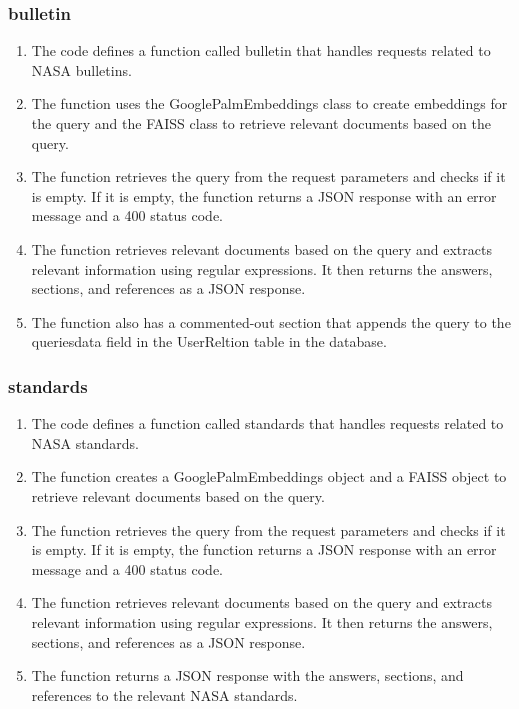 \documentclass[11pt]{article}
\begin{document}
\subsubsection{bulletin}
\begin{enumerate}
	\item The code defines a function called bulletin that handles requests related to NASA bulletins.
	\item The function uses the GooglePalmEmbeddings class to create embeddings for the query and the FAISS class to retrieve relevant documents based on the query.
	\item The function retrieves the query from the request parameters and checks if it is empty. If it is empty, the function returns a JSON response with an error message and a 400 status code.
	\item The function retrieves relevant documents based on the query and extracts relevant information using regular expressions. It then returns the answers, sections, and references as a JSON response.
	\item The function also has a commented-out section that appends the query to the queriesdata field in the UserReltion table in the database.
\end{enumerate}
\subsubsection{standards}
\begin{enumerate}
	\item The code defines a function called standards that handles requests related to NASA standards.
	\item The function creates a GooglePalmEmbeddings object and a FAISS object to retrieve relevant documents based on the query.
	\item The function retrieves the query from the request parameters and checks if it is empty. If it is empty, the function returns a JSON response with an error message and a 400 status code.
	\item The function retrieves relevant documents based on the query and extracts relevant information using regular expressions. It then returns the answers, sections, and references as a JSON response.
	\item The function returns a JSON response with the answers, sections, and references to the relevant NASA standards.
\end{enumerate}
\end{document}
